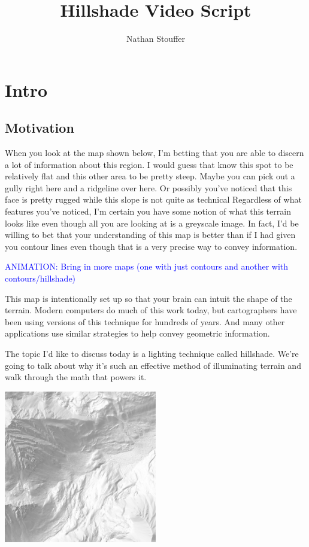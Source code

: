 \documentclass{article}
\newcommand\animation[1]{\textcolor{blue}{ANIMATION: #1}}
\begin{document}
	
\title{Hillshade Video Script}
\author{Nathan Stouffer}
\date{}
\maketitle

\section{Intro}

\subsection{Motivation}

When you look at the map shown below, I'm betting that you are able to discern a lot of information about this region.
I would guess that know this spot to be relatively flat and this other area to be pretty steep.
Maybe you can pick out a gully right here and a ridgeline over here.
Or possibly you've noticed that this face is pretty rugged while this slope is not quite as technical
Regardless of what features you've noticed, I'm certain you have some notion of what this terrain looks like even though all you are looking at is a greyscale image.
In fact, I'd be willing to bet that your understanding of this map is better than if I had given you contour lines even though that is a very precise way to convey information.

\animation{Bring in more maps (one with just contours and another with contours/hillshade)}

This map is intentionally set up so that your brain can intuit the shape of the terrain.
Modern computers do much of this work today, but cartographers have been using versions of this technique for hundreds of years.
And many other applications use similar strategies to help convey geometric information.

The topic I'd like to discuss today is a lighting technique called hillshade.
We're going to talk about why it's such an effective method of illuminating terrain and walk through the math that powers it.

\begin{center}
	\includegraphics[width=0.5\textwidth,frame]{assets/hillshade-example.png}
\end{center}
\end{document}

